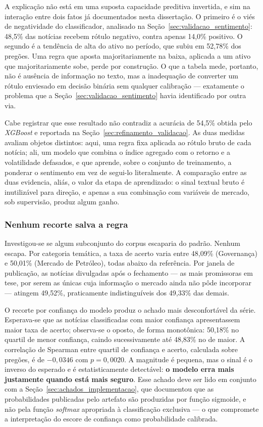 A explicação não está em uma suposta capacidade preditiva invertida, e sim na interação entre dois
fatos já documentados nesta dissertação. O primeiro é o viés de negatividade do classificador,
analisado na Seção~\ref{sec:validacao_sentimento}: 48,5\% das notícias recebem rótulo negativo, contra
apenas 14,0\% positivo. O segundo é a tendência de alta do ativo no período, que subiu em 52,78\% dos
pregões. Uma regra que aposta majoritariamente na baixa, aplicada a um ativo que majoritariamente
sobe, perde por construção. O que a tabela mede, portanto, não é ausência de informação no texto, mas
a inadequação de converter um rótulo enviesado em decisão binária sem qualquer calibração --- exatamente
o problema que a Seção~\ref{sec:validacao_sentimento} havia identificado por outra via.

Cabe registrar que esse resultado não contradiz a acurácia de 54,5\% obtida pelo \textit{XGBoost} e
reportada na Seção~\ref{sec:refinamento_validacao}. As duas medidas avaliam objetos distintos: aqui,
uma regra fixa aplicada ao rótulo bruto de cada notícia; ali, um modelo que combina o índice agregado
com o retorno e a volatilidade defasados, e que aprende, sobre o conjunto de treinamento, a ponderar
o sentimento em vez de segui-lo literalmente. A comparação entre as duas evidencia, aliás, o valor da
etapa de aprendizado: o sinal textual bruto é inutilizável para direção, e apenas a sua combinação
com variáveis de mercado, sob supervisão, produz algum ganho.

\subsubsection{Nenhum recorte salva a regra}

Investigou-se se algum subconjunto do corpus escaparia do padrão. Nenhum escapa. Por categoria
temática, a taxa de acerto varia entre 48,09\% (Governança) e 50,01\% (Mercado de Petróleo), todas
abaixo da referência. Por janela de publicação, as notícias divulgadas após o fechamento --- as mais
promissoras em tese, por serem as únicas cuja informação o mercado ainda não pôde incorporar --- atingem
49,52\%, praticamente indistinguíveis dos 49,33\% das demais.

O recorte por confiança do modelo produz o achado mais desconfortável da série. Esperava-se que as
notícias classificadas com maior confiança apresentassem maior taxa de acerto; observa-se o oposto,
de forma monotônica: 50,18\% no quartil de menor confiança, caindo sucessivamente até 48,83\% no de
maior. A correlação de Spearman entre quartil de confiança e acerto, calculada sobre pregões, é de
$-0{,}0346$ com $p = 0{,}0020$. A magnitude é pequena, mas o sinal é o inverso do esperado e é
estatisticamente detectável: \textbf{o modelo erra mais justamente quando está mais seguro}. Esse
achado deve ser lido em conjunto com a Seção~\ref{sec:achados_implementacao}, que documentou que as
probabilidades publicadas pelo artefato são produzidas por função sigmoide, e não pela função
\textit{softmax} apropriada à classificação exclusiva --- o que compromete a interpretação do escore
de confiança como probabilidade calibrada.


